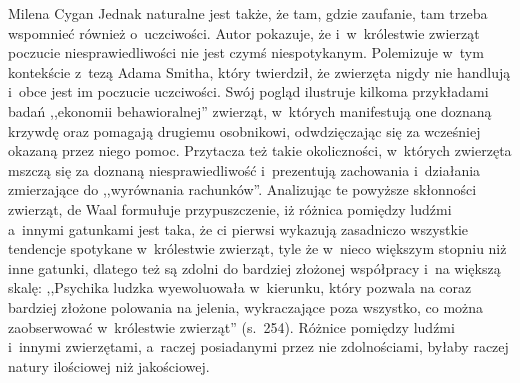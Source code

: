 \begin{recplenv}{Milena Cygan}
Jednak naturalne jest także, że tam, gdzie zaufanie, tam trzeba wspomnieć również o~uczciwości. Autor pokazuje,
że i~w~królestwie zwierząt poczucie niesprawiedliwości nie jest czymś niespotykanym. Polemizuje w~tym kontekście z~tezą Adama
Smitha, który twierdził, że zwierzęta nigdy nie handlują i~obce jest im poczucie uczciwości. Swój pogląd ilustruje
kilkoma przykładami badań ,,ekonomii behawioralnej'' zwierząt, w~których manifestują one doznaną krzywdę oraz pomagają
drugiemu osobnikowi, odwdzięczając się za wcześniej okazaną przez niego pomoc. Przytacza też takie
okoliczności, w~których zwierzęta mszczą się za doznaną niesprawiedliwość i~prezentują zachowania i~działania zmierzające do
,,wyrównania rachunków''. Analizując te powyższe skłonności zwierząt, de Waal formułuje przypuszczenie, iż różnica
pomiędzy ludźmi a~innymi gatunkami jest taka, że ci pierwsi wykazują zasadniczo wszystkie tendencje
spotykane w~królestwie zwierząt, tyle że w~nieco większym stopniu niż inne gatunki, dlatego też są zdolni do bardziej złożonej
współpracy i~na większą skalę: ,,Psychika ludzka wyewoluowała w~kierunku, który pozwala na coraz bardziej złożone
polowania na jelenia, wykraczające poza wszystko, co można zaobserwować w~królestwie zwierząt'' (s.~254). Różnice
pomiędzy ludźmi i~innymi zwierzętami, a~raczej posiadanymi przez nie zdolnościami, byłaby raczej natury ilościowej niż
jakościowej. 


\end{recplenv}
